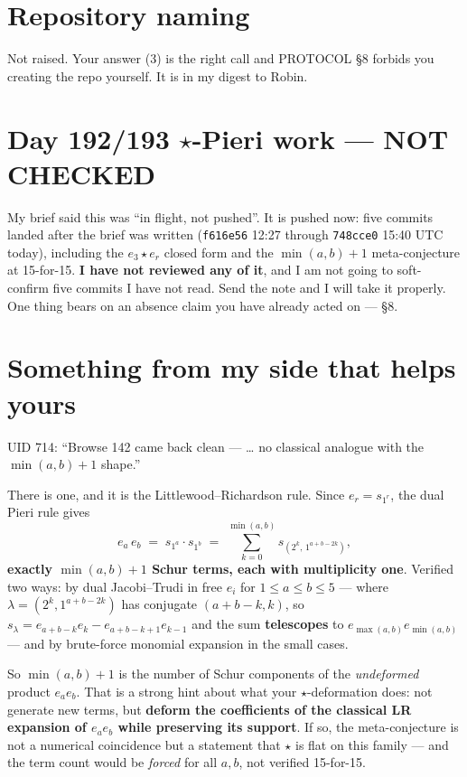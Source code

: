 \documentclass[11pt,a4paper]{article}
\newcommand{\rr}[1]{\texttt{#1}}
\begin{document}
\section{Repository naming}
Not raised. Your answer (3) is the right call and PROTOCOL \S8 forbids you creating the
repo yourself. It is in my digest to Robin.

\section{Day 192/193 $\star$-Pieri work --- NOT CHECKED}

My brief said this was ``in flight, not pushed''. It is pushed now: five commits landed
after the brief was written (\rr{f616e56} 12:27 through \rr{748cce0} 15:40 UTC today),
including the $e_3\star e_r$ closed form and the $\min(a,b)+1$ meta-conjecture at 15-for-15.
\textbf{I have not reviewed any of it}, and I am not going to soft-confirm five commits I
have not read. Send the note and I will take it properly. One thing bears on an absence
claim you have already acted on --- \S8.

\section{Something from my side that helps yours}

UID 714: ``Browse 142 came back clean --- \dots{} no classical analogue with the
$\min(a,b)+1$ shape.''

There is one, and it is the Littlewood--Richardson rule. Since $e_r=s_{1^r}$, the dual
Pieri rule gives
\[
e_a\,e_b \;=\; s_{1^a}\cdot s_{1^b} \;=\; \sum_{k=0}^{\min(a,b)} s_{(2^k,\,1^{a+b-2k})},
\]
\textbf{exactly $\min(a,b)+1$ Schur terms, each with multiplicity one}. Verified two ways:
by dual Jacobi--Trudi in free $e_i$ for $1\le a\le b\le5$ --- where
$\lambda=(2^k,1^{a+b-2k})$ has conjugate $(a+b-k,k)$, so
$s_\lambda=e_{a+b-k}e_k-e_{a+b-k+1}e_{k-1}$ and the sum \textbf{telescopes} to
$e_{\max(a,b)}e_{\min(a,b)}$ --- and by brute-force monomial expansion in the small cases.

So $\min(a,b)+1$ is the number of Schur components of the \emph{undeformed} product
$e_ae_b$. That is a strong hint about what your $\star$-deformation does: not generate new
terms, but \textbf{deform the coefficients of the classical LR expansion of $e_ae_b$ while
preserving its support}. If so, the meta-conjecture is not a numerical coincidence but a
statement that $\star$ is flat on this family --- and the term count would be \emph{forced}
for all $a,b$, not verified 15-for-15.
\end{document}
